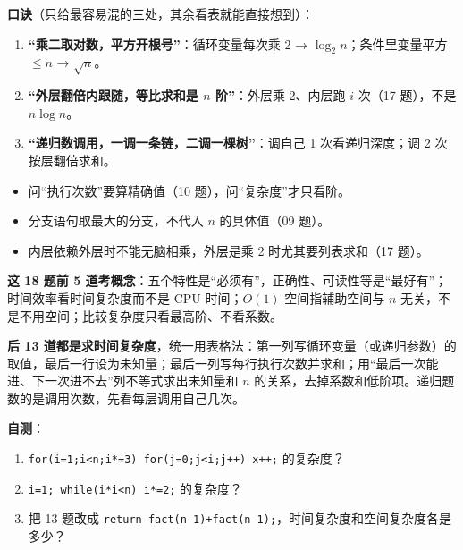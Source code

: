 \documentclass[10.5pt,a4paper,oneside]{article}
\providecommand{\tightlist}{\setlength{\itemsep}{2pt}\setlength{\parskip}{0pt}}
\begin{document}
\begin{exambox}

\textbf{口诀}（只给最容易混的三处，其余看表就能直接想到）：

\begin{enumerate}
\def\labelenumi{\arabic{enumi}.}
\tightlist
\item
  \textbf{“乘二取对数，平方开根号”}：循环变量每次乘 2 →
  \(\log_2 n\)；条件里变量平方 \(\le n\) → \(\sqrt n\)。
\item
  \textbf{“外层翻倍内跟随，等比求和是 \(n\) 阶”}：外层乘 2、内层跑 \(i\)
  次（17 题），不是 \(n\log n\)。
\item
  \textbf{“递归数调用，一调一条链，二调一棵树”}：调自己 1
  次看递归深度；调 2 次按层翻倍求和。
\end{enumerate}

\end{exambox}

\begin{pitfallbox}

\begin{itemize}
\tightlist
\item
  问“执行次数”要算精确值（10 题），问“复杂度”才只看阶。
\item
  分支语句取最大的分支，不代入 \(n\) 的具体值（09 题）。
\item
  内层依赖外层时不能无脑相乘，外层是乘 2 时尤其要列表求和（17 题）。
\end{itemize}

\end{pitfallbox}

\begin{summarybox}

\textbf{这 18 题前 5
道考概念}：五个特性是“必须有”，正确性、可读性等是“最好有”；时间效率看时间复杂度而不是
CPU 时间；\(O(1)\) 空间指辅助空间与 \(n\)
无关，不是不用空间；比较复杂度只看最高阶、不看系数。

\textbf{后 13
道都是求时间复杂度}，统一用表格法：第一列写循环变量（或递归参数）的取值，最后一行设为未知量；最后一列写每行执行次数并求和；用“最后一次能进、下一次进不去”列不等式求出未知量和
\(n\)
的关系，去掉系数和低阶项。递归题数的是调用次数，先看每层调用自己几次。

\textbf{自测}：

\begin{enumerate}
\def\labelenumi{\arabic{enumi}.}
\tightlist
\item
  \texttt{for(i=1;i\textless{}n;i*=3)\ for(j=0;j\textless{}i;j++)\ x++;}
  的复杂度？
\item
  \texttt{i=1;\ while(i*i\textless{}n)\ i*=2;} 的复杂度？
\item
  把 13 题改成
  \texttt{return\ fact(n-1)+fact(n-1);}，时间复杂度和空间复杂度各是多少？
\end{enumerate}

\end{summarybox}
\end{document}
